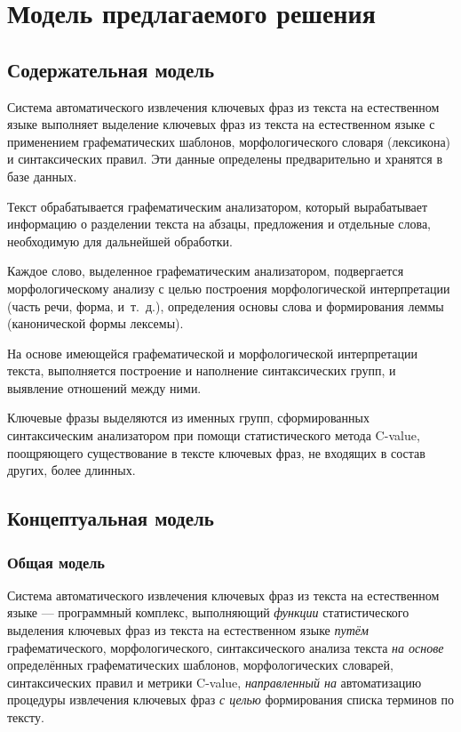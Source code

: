 \chapter{Модель предлагаемого решения}
\label{chap:Modeling}

\section{Содержательная модель}
Система автоматического извлечения ключевых фраз из текста на
естественном языке выполняет выделение ключевых фраз из текста на
естественном языке с применением графематических шаблонов,
морфологического словаря (лексикона) и синтаксических правил.
Эти данные определены предварительно и хранятся в базе данных.

Текст обрабатывается графематическим анализатором, который
вырабатывает информацию о разделении текста на абзацы,
предложения и отдельные слова, необходимую для дальнейшей обработки.

Каждое слово, выделенное графематическим анализатором,
подвергается морфологическому анализу с целью построения
морфологической интерпретации (часть речи, форма, и\ т.\ д.),
определения основы слова и формирования леммы
(канонической формы лексемы).

На основе имеющейся графематической и морфологической
интерпретации текста, выполняется построение и наполнение
синтаксических групп, и выявление отношений между ними.

Ключевые фразы выделяются из именных групп, сформированных
синтаксическим анализатором при помощи статистического
метода C-value, поощряющего существование в тексте
ключевых фраз, не входящих в состав других, более длинных.

\section{Концептуальная модель}

\subsection{Общая модель}
Система автоматического извлечения ключевых фраз из текста
на естественном языке — программный комплекс, выполняющий \emph{функции}
статистического выделения ключевых фраз из текста на естественном
языке \emph{путём} графематического, морфологического, синтаксического
анализа текста \emph{на основе} определённых графематических шаблонов,
морфологических словарей, синтаксических правил и метрики C-value,
\emph{направленный на} автоматизацию процедуры извлечения ключевых фраз
\emph{с целью} формирования списка терминов по тексту.

